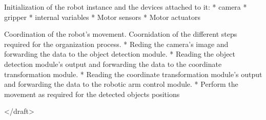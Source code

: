 Initialization of the robot instance and the devices attached to it: 
* camera
* gripper
* internal variables
* Motor sensors
* Motor actuators

Coordination of the robot's movement.
Coornidation of the different steps required for the organization process.
* Reding the camera's image and forwarding the data to the object detection module.
* Reading the object detection module's output and forwarding the data to the coordinate transformation module.
* Reading the coordinate transformation module's output and forwarding the data to the robotic arm control module.
* Perform the movement as required for the detected objects positions
  
</draft>

